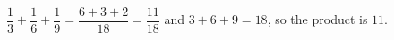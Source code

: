 $\dfrac13+\dfrac16+\dfrac19=\dfrac{6+3+2}{18}=\dfrac{11}{18}$ and $3+6+9=18$, so the product is $\boxed{11}$.
